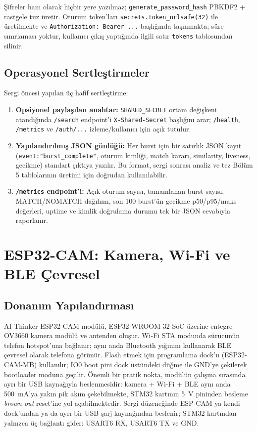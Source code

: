 Şifreler ham olarak hiçbir yere yazılmaz; \texttt{generate\_password\_hash}
PBKDF2 + rastgele tuz üretir. Oturum token'ları \texttt{secrets.token\_urlsafe(32)}
ile üretilmekte ve \texttt{Authorization: Bearer ...} başlığında taşınmakta;
süre sınırlaması yoktur, kullanıcı çıkış yaptığında ilgili satır
\texttt{tokens} tablosundan silinir.

\subsection{Operasyonel Sertleştirmeler}

Sergi öncesi yapılan üç hafif sertleştirme:

\begin{enumerate}
    \item \textbf{Opsiyonel paylaşılan anahtar:} \texttt{SHARED\_SECRET}
          ortam değişkeni atandığında \texttt{/search} endpoint'i
          \texttt{X-Shared-Secret} başlığını arar; \texttt{/health},
          \texttt{/metrics} ve \texttt{/auth/...} izleme/kullanıcı için
          açık tutulur.
    \item \textbf{Yapılandırılmış JSON günlüğü:} Her burst için bir
          satırlık JSON kayıt (\texttt{event:"burst\_complete"}, oturum
          kimliği, match kararı, similarity, liveness, gecikme) standart
          çıktıya yazılır. Bu format, sergi sonrası analiz ve tez Bölüm 5
          tablolarının üretimi için doğrudan kullanılabilir.
    \item \textbf{\texttt{/metrics} endpoint'i:} Açık oturum sayısı,
          tamamlanan burst sayısı, MATCH/NOMATCH dağılımı, son 100
          burst'ün gecikme p50/p95/maks değerleri, uptime ve kimlik
          doğrulama durumu tek bir JSON cevabıyla raporlanır.
\end{enumerate}

\section{ESP32-CAM: Kamera, Wi-Fi ve BLE Çevresel}

\subsection{Donanım Yapılandırması}

AI-Thinker ESP32-CAM modülü, ESP32-WROOM-32 SoC üzerine entegre OV3660
kamera modülü ve antenden oluşur. Wi-Fi STA modunda sürücünün telefon
hotspot'una bağlanır; aynı anda Bluetooth yığınını kullanarak BLE
çevresel olarak telefona görünür. Flash etmek için programlama dock'u
(ESP32-CAM-MB) kullanılır; IO0 boot pini dock üstündeki düğme ile GND'ye
çekilerek bootloader moduna geçilir. Önemli bir pratik nokta, modülün
çalışma sırasında ayrı bir USB kaynağıyla beslenmesidir: kamera + Wi-Fi
+ BLE aynı anda 500~mA'ya yakın pik akım çekebilmekte, STM32 kartının
5~V pininden besleme \emph{brown-out} reset'ine yol açabilmektedir.
Sergi düzeneğinde ESP-CAM ya kendi dock'undan ya da ayrı bir USB
şarj kaynağından beslenir; STM32 kartından yalnızca üç bağlantı
gider: USART6 RX, USART6 TX ve GND.

